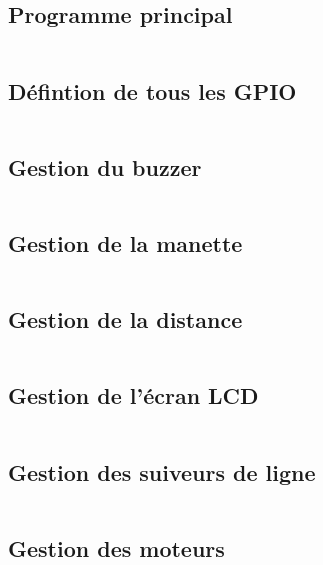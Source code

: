 \subsection{Programme principal}
    \inputminted[breaklines]{c}{code/src/main.c}
\subsection{Défintion de tous les GPIO}
    \inputminted[breaklines]{c}{code/include/gpioPins.h}
\subsection{Gestion du buzzer}
    \inputminted[breaklines]{c}{code/src/buzzer.c}
\subsection{Gestion de la manette}
    \inputminted[breaklines]{c}{code/src/controller.c}
\subsection{Gestion de la distance}
    \inputminted[breaklines]{c}{code/src/distance.c}
\subsection{Gestion de l'écran LCD}
    \inputminted[breaklines]{c}{code/src/i2cLCD.c}
\subsection{Gestion des suiveurs de ligne}
    \inputminted[breaklines]{c}{code/src/lineFinder.c}
\subsection{Gestion des moteurs}
    \inputminted[breaklines]{c}{code/src/motors.c}

\newpage